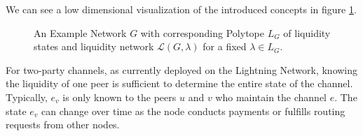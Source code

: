 \documentclass[10pt,twocolumn]{article}
\begin{document}
We can see a low dimensional visualization of the introduced concepts in figure \ref{fig:statePolytopeExample}.

\begin{figure}[h]
  \centering
  \caption{An Example Network \( G \) with corresponding Polytope \( L_G \) of liquidity states and liquidity network \( \mathcal{L}(G,\lambda) \) for a fixed \( \lambda \in L_G \).}
  \label{fig:statePolytopeExample}
\end{figure}

For two-party channels, as currently deployed on the Lightning Network, knowing the liquidity of one peer is sufficient to determine the entire state of the channel. Typically, \( e_v \) is only known to the peers \( u \) and \( v \) who maintain the channel \( e \). The state \( e_v \) can change over time as the node conducts payments or fulfills routing requests from other nodes.

\end{document}
